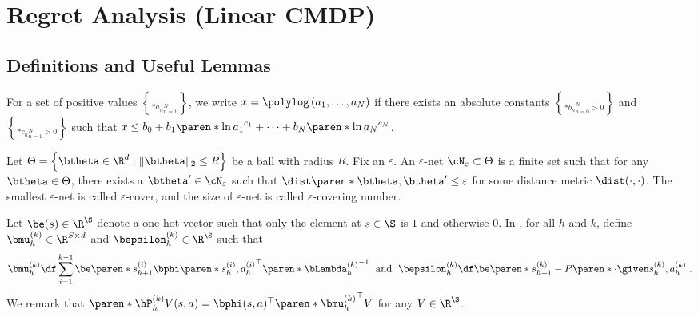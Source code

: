 \section{Regret Analysis (Linear CMDP)}\label{appendix:MDP-regret-analysis}
\subsection{Definitions and Useful Lemmas}

\begin{definition}
For a set of positive values $\brace*{a_n}_{n=1}^N$, we write $x=\polylog\left(a_1, \dots, a_N\right)$ if there exists an absolute constants $\brace*{b_n}_{n=0}^N >0$ and $\brace*{c_n}_{n=1}^N >0$ such that 
$
x \leq b_0 + b_1 \paren*{\ln a_1}^{c_1} + \dots + b_N \paren*{\ln a_N}^{c_N}
$.
\end{definition}

\begin{definition}
Let $\Theta=\left\{\btheta \in \R^d:\|\btheta\|_2 \leq R \right\}$ be a ball with radius $R$.
Fix an $\varepsilon$.
An $\varepsilon$-net $\cN_\varepsilon \subset \Theta$ is a finite set such that for any $\btheta \in \Theta$, there exists a $\btheta' \in \cN_\varepsilon$ such that $\dist\paren*{\btheta, \btheta'} \leq \varepsilon$ for some distance metric $\dist(\cdot, \cdot)$.
The smallest $\varepsilon$-net is called $\varepsilon$-cover, and the size of $\varepsilon$-net is called $\varepsilon$-covering number.
\end{definition}



\begin{definition}\label{def:mu-estimation}
Let \(\be(s) \in \R^\S\) denote a one-hot vector such that only the element at \(s \in \S\) is \(1\) and otherwise \(0\).
In , for all $h$ and $k$, define $\bmu^{(k)}_h \in \R^{S\times d}$ and $\bepsilon_h^{(k)} \in \R^\S$ such that
\begin{align}
\bmu^{(k)}_h \df 
\sum^{k-1}_{i=1} \be\paren*{s^{(i)}_{h+1}} \bphi\paren*{s^{(i)}_h, a_h^{(i)}}^\top \paren*{\bLambda^{(k)}_h}^{-1}
\;\text{ and }\; \bepsilon_h^{(k)} \df \be\paren*{s^{(k)}_{h+1}} - P\paren*{\cdot \given s^{(k)}_h, a^{(k)}_h} \;.
\end{align}
We remark that 
$\paren*{\hP^{(k)}_h V}(s, a) = \bphi(s, a)^\top \paren*{\bmu_h^{(k)}}^\top V$ for any $V \in \R^\S$.
\end{definition}

